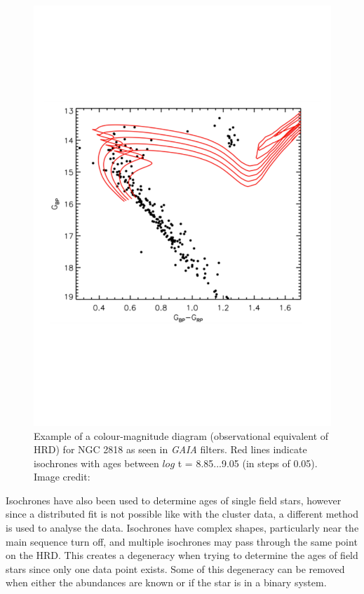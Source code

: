 \begin{figure}
    \centering
    \includegraphics[scale=0.45]{Figures/1-Introduction/gaia_OC_example.pdf}
    \caption[Example of colour-magnitude diagram for a cluster used to fit isochrones]{Example of a colour-magnitude diagram (observational equivalent of HRD) for NGC 2818 as seen in \textit{GAIA} filters. Red lines indicate isochrones with ages between $log$ t = 8.85...9.05 (in steps of 0.05). Image credit: \citet{Bastian_etal_2018}}
    \label{fig:OC_isochrone_example}
\end{figure}

Isochrones have also been used to determine ages of single field stars, however since a distributed fit is not possible like with the cluster data, a different method is used to analyse the data. Isochrones have complex shapes, particularly near the main sequence turn off, and multiple isochrones may pass through the same point on the HRD. This creates a degeneracy when trying to determine the ages of field stars since only one data point exists. Some of this degeneracy can be removed when either the abundances are known or if the star is in a binary system.

